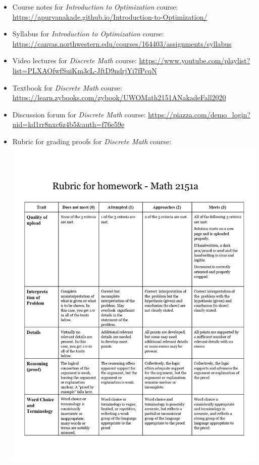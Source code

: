 \documentclass[
]{report}
\begin{document}
\begin{itemize}
\item
  Course notes for \emph{Introduction to Optimization} course: \url{https://apurvanakade.github.io/Introduction-to-Optimization/}
\item
  Syllabus for \emph{Introduction to Optimization} course: \url{https://canvas.northwestern.edu/courses/164403/assignments/syllabus}
\item
  Video lectures for \emph{Discrete Math} course: \url{https://www.youtube.com/playlist?list=PLXAOfwfSuiKm3cL-JftD9ndrjYi7fPcqN}
\item
  Textbook for \emph{Discrete Math} course: \url{https://learn.zybooks.com/zybook/UWOMath2151ANakadeFall2020}
\item
  Discussion forum for \emph{Discrete Math} course: \url{https://piazza.com/demo_login?nid=kd1rr8nxc6z4b5\&auth=f76e59e}
\item
  Rubric for grading proofs for \emph{Discrete Math} course:
  \includegraphics{images/Rubric for homework - Math 2151a_page-0001.jpg}
\end{itemize}
\end{document}
